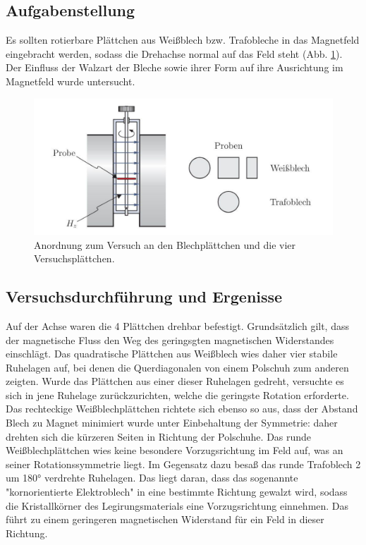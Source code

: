 \documentclass[a4paper,twoside,12pt,DIV=13,BCOR=5mm,numbers=noenddot,cleardoublepage=empty]{scrbook}
\begin{document}
\subsection{Aufgabenstellung}
Es sollten rotierbare Plättchen aus Weißblech bzw. Trafobleche in das Magnetfeld eingebracht werden, sodass die Drehachse normal auf das Feld steht (Abb. \ref{fig: RottierbarePlaettchen}). Der Einfluss der Walzart der Bleche sowie ihrer Form auf ihre Ausrichtung im Magnetfeld wurde untersucht. 
\begin{figure}
    \centering
    \includegraphics[scale=0.5]{pictures/Anordnung Blechproben.pdf}
    \caption{Anordnung zum Versuch an den Blechplättchen und die vier Versuchsplättchen.}
    \label{fig: RottierbarePlaettchen}
\end{figure}

\subsection{Versuchsdurchführung und Ergenisse}
\noindent Auf der Achse waren die 4 Plättchen drehbar befestigt. Grundsätzlich gilt, dass der magnetische Fluss den Weg des geringsgten magnetischen Widerstandes einschlägt. Das quadratische Plättchen aus Weißblech wies daher vier stabile Ruhelagen auf, bei denen die Querdiagonalen von einem Polschuh zum anderen zeigten. Wurde das Plättchen aus einer dieser Ruhelagen gedreht, versuchte es sich in jene Ruhelage zurückzurichten, welche die geringste Rotation erforderte. Das rechteckige Weißblechplättchen richtete sich ebenso so aus, dass der Abstand Blech zu Magnet minimiert wurde unter Einbehaltung der Symmetrie: daher drehten sich die kürzeren Seiten in Richtung der Polschuhe. Das runde Weißblechplättchen wies keine besondere Vorzugsrichtung im Feld auf, was an seiner Rotationssymmetrie liegt. Im Gegensatz dazu besaß das runde Trafoblech 2 um 180° verdrehte Ruhelagen. Das liegt daran, dass das sogenannte "kornorientierte Elektroblech" in eine bestimmte Richtung gewalzt wird, sodass die Kristallkörner des Legirungsmaterials eine Vorzugsrichtung einnehmen. Das führt zu einem geringeren magnetischen Widerstand für ein Feld in dieser Richtung.
\end{document}
